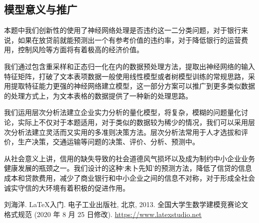 \documentclass{cumcmthesis}
\begin{document}
\subsection{模型意义与推广}
本题中我们创新性的使用了神经网络处理是否违约这一二分类问题，对于银行来说，如果在放贷前就能预测出一个有参考价值的违约率，对于降低银行的运营费用，控制风险等方面将有着极高的经济价值。

我们通过包含重采样和正态归一化在内的数据预处理方法，提取出神经网络的输入特征矩阵，打破了文本表项数据一般使用线性模型或者树模型训练的常规思路，采用提取特征能力更强的神经网络建立模型，这一部分方案可以推广到更多类似数据的处理方式上，为文本表格的数据提供了一种新的处理思路。

我们运用层次分析法建立企业实力分析的量化模型，将复杂，模糊的问题量化讨论，实际上不仅对于本题适用，对于类似的数据较为稀少的情况，我们可以采用层次分析法建立灵活而又实用的多准则决策方法。层次分析法常用于人才选拔和评价，生产决策，交通运输等问题的决策、评价、分析、预测中。

从社会意义上讲，信用的缺失导致的社会道德风气损坏以及成为制约中小企业业务健康发展的瓶颈之一。我们设计的这种‘未卜先知’的预测方法，降低了信贷的信息成本和贷款费用，减少了商业银行和中小企业之间的信息不对称，对于形成全社会诚实守信的大环境有着积极的促进作用。


\begin{thebibliography}{9}%
    刘海洋.
    \newblock \LaTeX {}入门\allowbreak[J].
    \newblock 电子工业出版社, 北京, 2013.
    全国大学生数学建模竞赛论文格式规范 (2020 年 8 月 25 日修改).
     \url{https://www.latexstudio.net}
\end{thebibliography}
\end{document}
